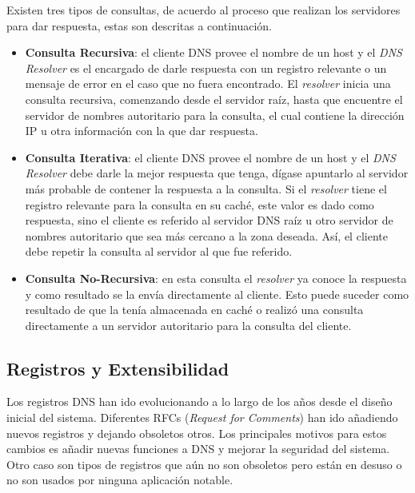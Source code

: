 Existen tres tipos de consultas, de acuerdo al proceso que realizan los servidores para dar respuesta, estas son descritas a continuación.

\begin{itemize}
    \item \textbf{Consulta Recursiva}: el cliente DNS provee el nombre de un host y el \textit{DNS Resolver} es el encargado de darle respuesta con un registro relevante o un mensaje de error en el caso que no fuera encontrado. El \textit{resolver} inicia una consulta recursiva, comenzando desde el servidor raíz, hasta que encuentre el servidor de nombres autoritario para la consulta, el cual contiene la dirección IP u otra información con la que dar respuesta. 
    
    \item \textbf{Consulta Iterativa}: el cliente DNS provee el nombre de un host y el \textit{DNS Resolver} debe darle la mejor respuesta que tenga, dígase apuntarlo al servidor más probable de contener la respuesta a la consulta. Si el \textit{resolver} tiene el registro relevante para la consulta en su caché, este valor es dado como respuesta, sino el cliente es referido al servidor DNS raíz u otro servidor de nombres autoritario que sea más cercano a la zona deseada. Así, el cliente debe repetir la consulta al servidor al que fue referido.
    
    \item \textbf{Consulta No-Recursiva}: en esta consulta el \textit{resolver} ya conoce la respuesta y como resultado se la envía directamente al cliente. Esto puede suceder como resultado de que la tenía almacenada en caché o realizó una consulta directamente a un servidor autoritario para la consulta del cliente.
\end{itemize}

\subsection{Registros y Extensibilidad}

Los registros DNS han ido evolucionando a lo largo de los años desde el diseño inicial del sistema. Diferentes RFCs (\textit{Request for Comments}) han ido añadiendo nuevos registros y dejando obsoletos otros. Los principales motivos para estos cambios es añadir nuevas funciones a DNS y mejorar la seguridad del sistema. Otro caso son tipos de registros que aún no son obsoletos pero están en desuso o no son usados por ninguna aplicación notable.

